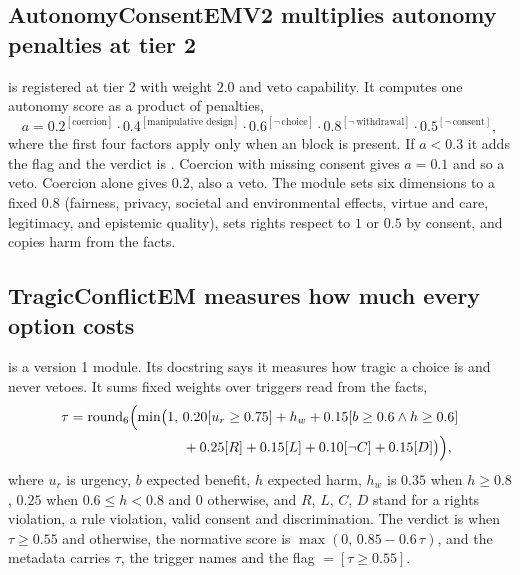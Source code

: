 \subsection{AutonomyConsentEMV2 multiplies autonomy penalties at tier 2}

 is registered at tier 2 with weight $2.0$ and veto capability. It
computes one autonomy score as a product of penalties,
\begin{equation}
a = 0.2^{[\text{coercion}]}\cdot 0.4^{[\text{manipulative design}]}\cdot 0.6^{[\neg\,\text{choice}]}\cdot 0.8^{[\neg\,\text{withdrawal}]}\cdot 0.5^{[\neg\,\text{consent}]},
\label{eq:deme-autonomy}
\end{equation}
where the first four factors apply only when an  block is present. If
$a < 0.3$ it adds the flag  and the verdict is . Coercion
with missing consent gives $a = 0.1$ and so a veto. Coercion alone gives $0.2$, also a veto. The
module sets six dimensions to a fixed $0.8$ (fairness, privacy, societal and environmental
effects, virtue and care, legitimacy, and epistemic quality), sets rights respect to $1$ or $0.5$
by consent, and copies harm from the facts.

\subsection{TragicConflictEM measures how much every option costs}

 is a version 1 module. Its docstring says it measures how tragic a choice
is and never vetoes. It sums fixed weights over triggers read from the facts,
\begin{equation}
\begin{aligned}
\tau = \operatorname{round}_6\Bigl(\min\bigl(1,\ &0.20[u_r \ge 0.75] + h_w + 0.15[b \ge 0.6 \wedge h \ge 0.6]\\
&+ 0.25[R] + 0.15[L] + 0.10[\neg C] + 0.15[D]\bigr)\Bigr),
\end{aligned}
\label{eq:deme-tragic}
\end{equation}
where $u_r$ is urgency, $b$ expected benefit, $h$ expected harm, $h_w$ is $0.35$ when
$h \ge 0.8$, $0.25$ when $0.6 \le h < 0.8$ and $0$ otherwise, and $R$, $L$, $C$, $D$ stand for a
rights violation, a rule violation, valid consent and discrimination. The verdict is
 when $\tau \ge 0.55$ and  otherwise, the normative score is
$\max(0,\, 0.85 - 0.6\,\tau)$, and the metadata carries $\tau$, the trigger names and the flag
 $= [\tau \ge 0.55]$.

